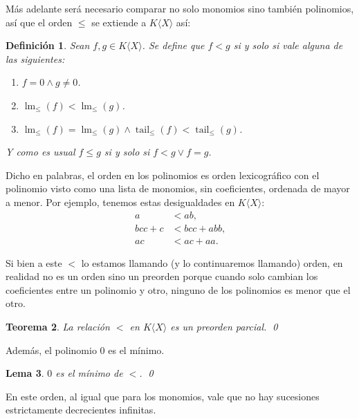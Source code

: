 \documentclass[12pt]{report}
\theoremstyle{customstyle}
\newtheorem{theorem}{Teorema}[chapter]
\newtheorem{definition}[theorem]{Definición}
\newtheorem{lemma}[theorem]{Lema}
\theoremstyle{factstyle}
\DeclareMathOperator{\lm}{lm}
\DeclareMathOperator{\tail}{tail}
\begin{document}
Más adelante será necesario comparar no solo monomios sino también polinomios, así que el orden $≤$ se extiende a $K⟨X⟩$ así:

\begin{definition}\label{def:orden polinomial}
  Sean $f, g ∈ K⟨X⟩$. Se define que $f < g$ si y solo si vale alguna de las siguientes:
  \begin{enumerate}
    \item $f = 0 ∧ g ≠ 0$.
    \item $\lm_≤(f) < \lm_≤(g)$.
    \item $\lm_≤(f) = \lm_≤(g) ∧ \tail_≤(f) < \tail_≤(g)$.
  \end{enumerate}
  Y como es usual $f ≤ g$ si y solo si $f < g ∨ f = g$.
\end{definition}

Dicho en palabras, el orden en los polinomios es orden lexicográfico con el polinomio visto como una lista de monomios, sin coeficientes, ordenada de mayor a menor. Por ejemplo, tenemos estas desigualdades en $K⟨X⟩$:
\begin{align*}
  a &< ab \text{,} \\
  bcc + c &< bcc + abb \text{,} \\
  ac &< ac + aa \text{.}
\end{align*}

Si bien a este $<$ lo estamos llamando (y lo continuaremos llamando) orden, en realidad no es un orden sino un preorden porque cuando solo cambian los coeficientes entre un polinomio y otro, ninguno de los polinomios es menor que el otro.

\begin{theorem}
  La relación $<$ en $K⟨X⟩$ es un preorden parcial.
  \qed
\end{theorem}

Además, el polinomio $0$ es el mínimo.

\begin{lemma}\label{lemma:0 es mínimo}
  $0$ es el mínimo de $<$.
  \qed
\end{lemma}

En este orden, al igual que para los monomios, vale que no hay sucesiones estrictamente decrecientes infinitas.
\end{document}
